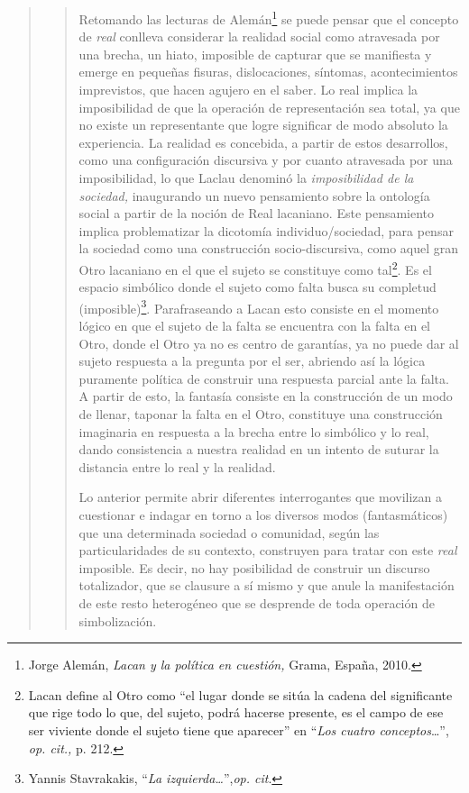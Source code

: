\begin{quote}
\begin{quote}
Retomando las lecturas de Alemán\footnote{Jorge Alemán, \emph{Lacan y la política en cuestión,} Grama, España, 2010.} se puede pensar que el concepto de \emph{real} conlleva considerar la realidad social como atravesada por una brecha, un hiato, imposible de capturar que se manifiesta y emerge en pequeñas fisuras, dislocaciones, síntomas, acontecimientos imprevistos, que hacen agujero en el saber. Lo real implica la imposibilidad de que la operación de representación sea total, ya que no existe un representante que logre significar de modo absoluto la experiencia. La realidad es concebida, a partir de estos desarrollos, como una configuración discursiva y por cuanto atravesada por una imposibilidad, lo que Laclau denominó la \emph{imposibilidad de la sociedad,} inaugurando un nuevo pensamiento sobre la ontología social a partir de la noción de Real lacaniano. Este pensamiento implica problematizar la dicotomía individuo/sociedad, para pensar la sociedad como una construcción socio-discursiva, como aquel gran Otro lacaniano en el que el sujeto se constituye como tal\footnote{Lacan define al Otro como \enquote{el lugar donde se sitúa la cadena del significante que rige todo lo que, del sujeto, podrá hacerse presente, es el campo de ese ser viviente donde el sujeto tiene que aparecer} en \enquote{\emph{Los cuatro conceptos}\ldots}, \emph{op. cit.,} p. 212.}. Es el espacio simbólico donde el sujeto como falta busca su completud (imposible)\footnote{Yannis Stavrakakis, \enquote{\emph{La izquierda\ldots{}}},\emph{op. cit}.}. Parafraseando a Lacan esto consiste en el momento lógico en que el sujeto de la falta se encuentra con la falta en el Otro, donde el Otro ya no es centro de garantías, ya no puede dar al sujeto respuesta a la pregunta por el ser, abriendo así la lógica puramente política  de construir una respuesta parcial ante la falta. A partir de esto, la fantasía consiste en la construcción de un modo de llenar, taponar la falta en el Otro, constituye una construcción imaginaria en respuesta a la brecha entre lo simbólico y lo real, dando consistencia a nuestra realidad en un intento de suturar la distancia entre lo real y la realidad.

Lo anterior permite abrir diferentes interrogantes que movilizan a cuestionar e indagar en torno a los diversos modos (fantasmáticos) que una determinada sociedad o comunidad, según las particularidades de su contexto, construyen para tratar con este \emph{real} imposible. Es decir, no hay posibilidad de construir un discurso totalizador, que se clausure a sí mismo y que anule la manifestación de este resto heterogéneo que se desprende de toda operación de simbolización.


\end{quote}
\end{quote}

